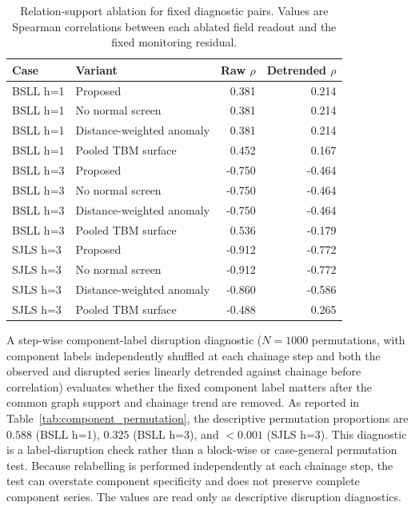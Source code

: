 \begin{table}[htbp]
\centering
\caption{Relation-support ablation for fixed diagnostic pairs. Values are
Spearman correlations between each ablated field readout and the fixed
monitoring residual.}
\label{tab:relation_support_ablation}
\scriptsize
\setlength{\tabcolsep}{4pt}
\begin{tabular}{llrr}
\toprule
Case & Variant & Raw $\rho$ & Detrended $\rho$ \\
\midrule
BSLL h=1 & Proposed & 0.381 & 0.214 \\
BSLL h=1 & No normal screen & 0.381 & 0.214 \\
BSLL h=1 & Distance-weighted anomaly & 0.381 & 0.214 \\
BSLL h=1 & Pooled TBM surface & 0.452 & 0.167 \\
BSLL h=3 & Proposed & -0.750 & -0.464 \\
BSLL h=3 & No normal screen & -0.750 & -0.464 \\
BSLL h=3 & Distance-weighted anomaly & -0.750 & -0.464 \\
BSLL h=3 & Pooled TBM surface & 0.536 & -0.179 \\
SJLS h=3 & Proposed & -0.912 & -0.772 \\
SJLS h=3 & No normal screen & -0.912 & -0.772 \\
SJLS h=3 & Distance-weighted anomaly & -0.860 & -0.586 \\
SJLS h=3 & Pooled TBM surface & -0.488 & 0.265 \\
\bottomrule
\end{tabular}
\end{table}

A step-wise component-label disruption diagnostic ($N=1000$ permutations, with
component labels independently shuffled at each chainage step and both the
observed and disrupted series linearly detrended against chainage before
correlation) evaluates whether the fixed component label matters after the
common graph support and chainage trend are removed. As reported in
Table~\ref{tab:component_permutation}, the descriptive permutation proportions
are $0.588$ (BSLL h=1), $0.325$ (BSLL h=3), and $<0.001$ (SJLS h=3). This
diagnostic is a label-disruption check rather than a block-wise or
case-general permutation test. Because relabelling is performed independently
at each chainage step, the test can overstate component specificity and does
not preserve complete component series. The values are read only as
descriptive disruption diagnostics.

